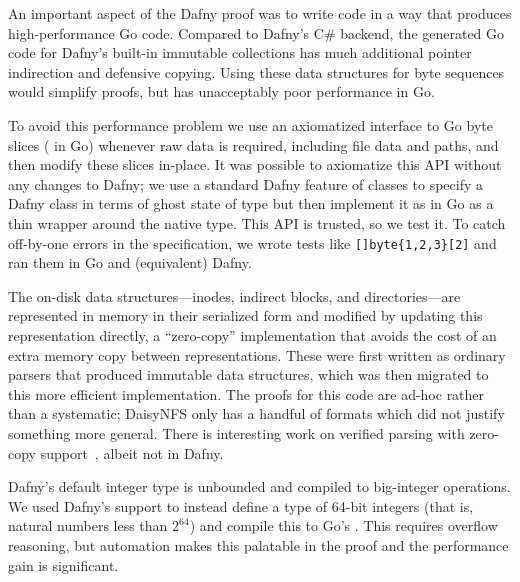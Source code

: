 An important aspect of the Dafny proof was to write code in a way that produces
high-performance Go code.
Compared to Dafny's C\# backend, the generated Go code for Dafny's built-in
immutable collections has much
additional pointer indirection and defensive copying. Using these data
structures for byte sequences would simplify proofs, but has unacceptably poor
performance in Go.

To avoid this performance problem we use an axiomatized interface to
Go byte slices ( in Go) whenever raw data is required, including file
data and paths, and then modify these slices in-place. It was possible to
axiomatize this API without any changes to Dafny; we use a standard Dafny
feature of  classes to specify a Dafny class  in terms of
ghost state of type  but then implement it as in Go as a thin
wrapper around the native  type. This API is trusted, so we
test it. To catch off-by-one errors in the specification, we wrote
tests like \verb![]byte{1,2,3}[2]! and ran them in Go and
(equivalent) Dafny.

The on-disk data structures---inodes, indirect blocks, and directories---are
represented in memory in their serialized form and modified by updating this
representation directly, a ``zero-copy'' implementation that avoids the cost of
an extra memory copy between representations. These were first written as
ordinary parsers that produced immutable data structures, which was then
migrated to this more efficient implementation. The proofs for this code are
ad-hoc rather than a systematic; DaisyNFS only has a handful of formats which
did not justify something more general. There is interesting work on
verified parsing with zero-copy support~\cite{swamy:everparse3d}, albeit not in Dafny.

Dafny's default integer type  is unbounded and compiled to big-integer
operations. We used Dafny's
 support to instead define a type of 64-bit integers (that
is, natural numbers less than $2^{64}$) and compile this to Go's .
This requires overflow reasoning, but
automation makes this palatable in the proof and the performance gain is
significant.
